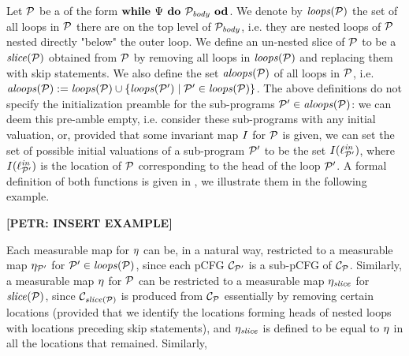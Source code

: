 Let $\mathcal{P}$ be a \PP{} of the form $\textbf{while } \Psi \textbf{ do } 
\mathcal{P}_{\mathit{body}} \textbf{ od}$. We denote by $\mathit{loops}(\mathcal{P})$ the set of all 
loops in $\mathcal{P}$ there are on the top level of $\mathcal{P}_{\mathit{body}}$, i.e. they are 
nested loops of $\mathcal{P}$ nested directly "below" the outer loop. We define an 
un-nested slice of $\mathcal{P}$ to be a \PP{} $\mathit{slice}(\mathcal{P})$ obtained from 
$\mathcal{P}$ by removing all loops in $\mathit{loops}(\mathcal{P})$ and replacing them with 
skip statements. We also define the set 
$\mathit{aloops}(\mathcal{P})$ of all loops in $\mathcal{P}$, i.e. 
$\mathit{aloops}(\mathcal{P}):=\mathit{loops}(\mathcal{P})\cup \{\mathit{loops}(\mathcal{P}')\mid \mathcal{P}'\in 
\mathit{loops}(\mathcal{P})\}$. The above definitions do not specify the initialization 
preamble for the sub-programs $\mathcal{P}'\in\mathit{aloops}(\mathcal{P})$: we can deem 
this pre-amble empty, i.e. consider these sub-programs with any initial 
valuation, or, provided that some invariant map $I$ for $\mathcal{P}$ is 
given, we can set the set of possible initial valuations of a sub-program 
$\mathcal{P}'$ to be the set $I(\ell^{\mathit{in}}_{\mathcal{P}'})$, where 
$I(\ell^{\mathit{in}}_{\mathcal{P}'})$ is the location of $\mathcal{P}$ corresponding to 
the head of the loop $\mathcal{P}'$.
A formal definition of 
both functions is given in \AppendixMaterial, we illustrate them in the 
following example.

\textbf{[PETR: INSERT EXAMPLE]}


Each measurable map for $\eta$ can be, in a natural way, restricted to a 
measurable map $\eta_{\mathcal{P}'}$ for $\mathcal{P}'\in \mathit{loops}(\mathcal{P})$, 
since each pCFG $\mathcal{C}_{\mathcal{P}'}$ is a sub-pCFG of $\mathcal{C}_{\mathcal{P}}$. 
Similarly, a measurable map $\eta$ for $\mathcal{P}$ can be restricted to a 
measurable map $\eta_{\mathit{slice}}$ for $\mathit{slice}(\mathcal{P})$, since 
$\mathcal{C}_{\mathit{slice}(\mathcal{P})}$ is produced from $\mathcal{C}_{\mathcal{P}}$ essentially by 
removing certain locations (provided that we identify the locations forming 
heads of nested loops with locations preceding skip statements), and 
$\eta_{\mathit{slice}}$ is defined to be equal to $\eta$ in all the locations that 
remained. Similarly, 

